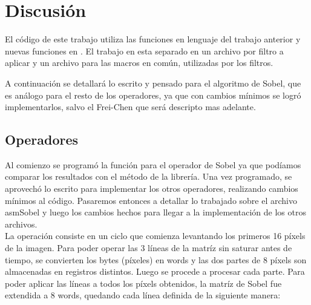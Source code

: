 \section{Discusi\'on}

El c\'odigo de este trabajo utiliza las funciones en lenguaje  del trabajo anterior y nuevas funciones en . El trabajo en  esta separado en un archivo por filtro a aplicar y un  archivo para las macros en com\'un, utilizadas por los filtros.
	
A continuaci\'on se detallar\'a lo escrito y pensado para el algoritmo de Sobel, que es an\'alogo para el resto de los operadores, ya que con cambios m\'inimos se logr\'o implementarlos, salvo el Frei-Chen que ser\'a descripto mas adelante. \\

\subsection{Operadores}

Al comienzo se program\'o la funci\'on para el operador de Sobel ya que pod\'iamos comparar los resultados con el m\'etodo  de la librer\'ia. Una vez programado, se aprovech\'o lo escrito para implementar los otros operadores, realizando cambios m\'inimos al c\'odigo. Pasaremos entonces a detallar lo trabajado sobre el archivo asmSobel y luego los cambios hechos para llegar a la implementaci\'on de los otros archivos. \\

\noindent La operaci\'on consiste en un ciclo que comienza levantando los primeros 16 p\'ixels de la imagen. Para poder operar las 3 l\'ineas de la matr\'iz sin saturar antes de tiempo, se convierten los bytes (p\'ixeles) en words y las dos partes de 8 p\'ixels son almacenadas en registros distintos. Luego se procede a procesar cada parte. Para poder aplicar las l\'ineas a todos los p\'ixels obtenidos, la matr\'iz de Sobel fue extendida a 8 words, quedando cada l\'inea definida de la siguiente manera: \\


